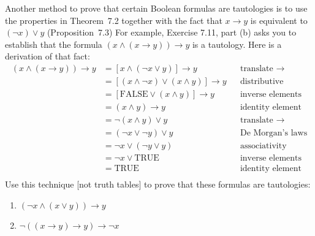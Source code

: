 \documentclass{article}
\theoremstyle{definition}
\begin{document}
\begin{question}{10}
    Another method to prove that certain Boolean formulas
    are tautologies is to use the properties in Theorem~7.2
    together with the fact that $x \rightarrow y$ is equivalent
    to $(\neg x) \vee y$ (Proposition~7.3)
    For example, Exercise 7.11, part (b) asks you to establish that the formula $(x \wedge (x \rightarrow y)) \rightarrow y$ is 
    a tautology.  Here is a derivation of that fact:
    \begin{align*}
        (x \wedge (x \rightarrow y)) \rightarrow y
        &= [x \wedge (\neg x \vee y)] \rightarrow y
        && \text{translate $\rightarrow$} 
        \\
        &= [(x \wedge \neg x) \vee (x \wedge y)] \rightarrow y
        && \text{distributive}
        \\
        &= [\mathrm{FALSE} \vee (x\wedge y)] \rightarrow y
        && \text{inverse elements}
        \\
        &= (x\wedge y) \rightarrow y
        && \text{identity element}
        \\
        &= \neg(x\wedge y) \vee y
        && \text{translate $\rightarrow$}
        \\
        &= (\neg x \vee \neg y) \vee y
        && \text{De~Morgan's laws}
        \\
        &= \neg x \vee (\neg y \vee y)
        && \text{associativity}
        \\
        &= \neg x \vee \mathrm{TRUE}
        && \text{inverse elements}
        \\
        &= \mathrm{TRUE}
        && \text{identity element}
        \\
    \end{align*}
    Use this technique [not truth tables] to prove that these formulas
    are tautologies:
    \begin{enumerate}
        \item $(\neg x \wedge (x \vee y)) \rightarrow y$
        \item $\neg ( (x \rightarrow y) \rightarrow  y) \rightarrow \neg x$
    \end{enumerate}
\end{question}
\end{document}
